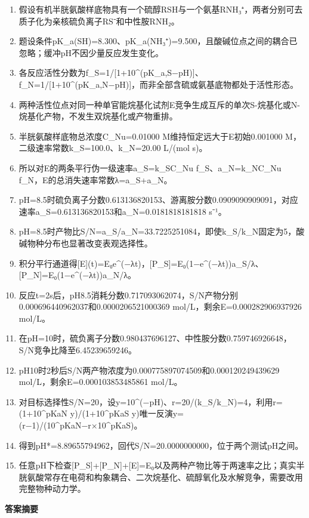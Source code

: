 \documentclass[UTF8,11pt,a4paper]{ctexart}
\begin{document}
\begin{enumerate}
\item 假设有机半胱氨酸样底物具有一个硫醇RSH与一个氨基RNH₃⁺，两者分别可去质子化为亲核硫负离子RS⁻和中性胺RNH₂。
\item 题设条件pK\_a(SH)=8.300、pK\_a(NH₃⁺)=9.500，且酸碱位点之间的耦合已忽略；缓冲pH不因少量反应发生变化。
\item 各反应活性分数为f\_S=1/[1+10\textasciicircum{}(pK\_a,S−pH)]、f\_N=1/[1+10\textasciicircum{}(pK\_a,N−pH)]，而非全部含硫或氨基底物都处于活性形态。
\item 两种活性位点对同一种单官能烷基化试剂E竞争生成互斥的单次S-烷基化或N-烷基化产物，不发生双烷基化或产物重排。
\item 半胱氨酸样底物总浓度C\_Nu=0.01000 M维持恒定远大于E初始0.001000 M，二级速率常数k\_S=100.0、k\_N=20.00 L/(mol s)。
\item 所以对E的两条平行伪一级速率a\_S=k\_SC\_Nu f\_S、a\_N=k\_NC\_Nu f\_N，E的总消失速率常数λ=a\_S+a\_N。
\item pH=8.5时硫负离子分数0.613136820153、游离胺分数0.0909090909091，对应速率a\_S=0.613136820153和a\_N=0.0181818181818 s⁻¹。
\item pH=8.5时产物比S/N=a\_S/a\_N=33.7225251084，即使k\_S/k\_N固定为5，酸碱物种分布也显著改变表观选择性。
\item 积分平行通道得[E](t)=E₀e\textasciicircum{}(−λt)，[P\_S]=E₀(1−e\textasciicircum{}(−λt))a\_S/λ、[P\_N]=E₀(1−e\textasciicircum{}(−λt))a\_N/λ。
\item 反应t=2s后，pH8.5消耗分数0.717093062074，S/N产物分别0.000696440962037和0.0000206521000369 mol/L，剩余E=0.000282906937926 mol/L。
\item 在pH=10时，硫负离子分数0.980437696127、中性胺分数0.759746926648，S/N竞争比降至6.45239659246。
\item pH10时2秒后S/N两产物浓度为0.000775897074509和0.000120249439629 mol/L，剩余E=0.000103853485861 mol/L。
\item 对目标选择性S/N=20，设y=10\textasciicircum{}(−pH)、r=20/(k\_S/k\_N)=4，利用r=(1+10\textasciicircum{}pKaN y)/(1+10\textasciicircum{}pKaS y)唯一反演y=(r−1)/(10\textasciicircum{}pKaN−r×10\textasciicircum{}pKaS)。
\item 得到pH*=8.89655794962，回代S/N=20.0000000000，位于两个测试pH之间。
\item 任意pH下检查[P\_S]+[P\_N]+[E]=E₀以及两种产物比等于两速率之比；真实半胱氨酸常存在电荷和构象耦合、二次烷基化、硫醇氧化及水解竞争，需要改用完整物种动力学。
\end{enumerate}
\noindent\textbf{答案摘要}\par
\end{document}
